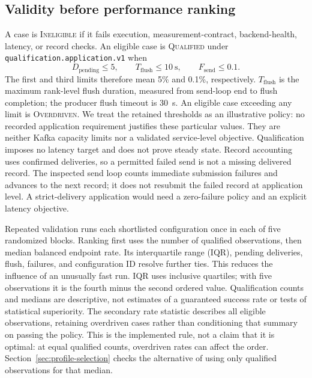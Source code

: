 \documentclass[10pt]{article}
\newcommand{\qualified}{\textsc{Qualified}}
\newcommand{\overdriven}{\textsc{Overdriven}}
\newcommand{\ineligible}{\textsc{Ineligible}}
\begin{document}
\subsection{Validity before performance ranking}

A case is \ineligible{} if it fails execution, measurement-contract, backend-health,
latency, or record checks.  An eligible case is \qualified{}
under \texttt{qualification.application.v1} when
\begin{equation}
 D_{\mathrm{pending}}\leq5,\qquad
 T_{\mathrm{flush}}\leq10\ \mathrm{s},\qquad
 F_{\mathrm{send}}\leq0.1.
 \label{eq:qualification-policy}
\end{equation}
The first and third limits therefore mean 5\% and 0.1\%, respectively.
$T_{\mathrm{flush}}$ is the maximum rank-level flush duration, measured
from send-loop end to flush completion; the producer flush timeout is 30~s.
An eligible case exceeding any limit is \overdriven{}.  We treat the retained
thresholds as an illustrative policy: no recorded application requirement
justifies these particular values.  They are neither Kafka capacity limits nor
a validated service-level objective.  Qualification imposes no latency target
and does not prove steady state.  Record accounting uses confirmed deliveries,
so a permitted failed send is not a missing delivered record.  The inspected
send loop counts immediate submission failures and advances to the next record;
it does not resubmit the failed record at application level.  A strict-delivery
application would need a zero-failure policy and an explicit latency objective.

Repeated validation runs each shortlisted configuration once in each of five
randomized blocks.  Ranking first uses the number of qualified observations, then
median balanced endpoint rate.  Its interquartile range (IQR), pending
deliveries, flush, failures, and configuration ID resolve further ties.  This
reduces the influence of an unusually fast run.  IQR uses inclusive quartiles;
with five observations it is the fourth minus the second ordered value.  Qualification
counts and medians are descriptive, not estimates of a guaranteed success rate
or tests of statistical superiority.
The secondary rate statistic describes all eligible observations, retaining
overdriven cases rather than conditioning that summary on passing the policy.
This is the implemented rule, not a claim that it is optimal: at equal qualified
counts, overdriven rates can affect the order. Section~\ref{sec:profile-selection}
checks the alternative of using only qualified observations for that median.
\end{document}
